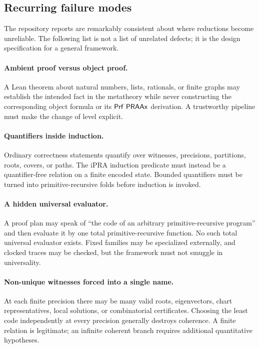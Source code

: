 \subsection{Recurring failure modes}

The repository reports are remarkably consistent about where reductions become unreliable.  The following list is not a list of unrelated defects; it is the design specification for a general framework.

\paragraph{Ambient proof versus object proof.}
A Lean theorem about natural numbers, lists, rationals, or finite graphs may establish the intended fact in the metatheory while never constructing the corresponding object formula or its \(\mathsf{Prf}\ \mathsf{PRAAx}\) derivation.  A trustworthy pipeline must make the change of level explicit.

\paragraph{Quantifiers inside induction.}
Ordinary correctness statements quantify over witnesses, precisions, partitions, roots, covers, or paths.  The iPRA induction predicate must instead be a quantifier-free relation on a finite encoded state.  Bounded quantifiers must be turned into primitive-recursive folds before induction is invoked.

\paragraph{A hidden universal evaluator.}
A proof plan may speak of ``the code of an arbitrary primitive-recursive program'' and then evaluate it by one total primitive-recursive function.  No such total universal evaluator exists.  Fixed families may be specialized externally, and clocked traces may be checked, but the framework must not smuggle in universality.

\paragraph{Non-unique witnesses forced into a single name.}
At each finite precision there may be many valid roots, eigenvectors, chart representatives, local solutions, or combinatorial certificates.  Choosing the least code independently at every precision generally destroys coherence.  A finite relation is legitimate; an infinite coherent branch requires additional quantitative hypotheses.


